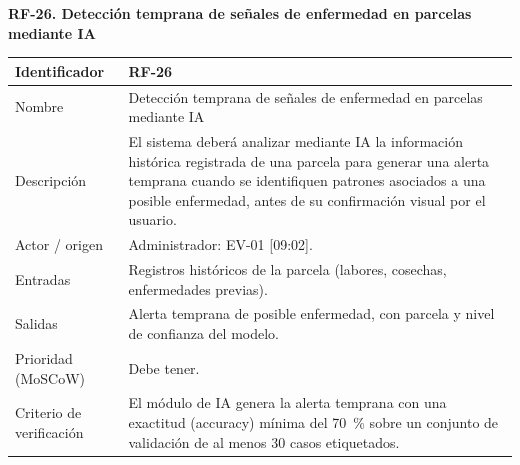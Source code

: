 \documentclass[12pt,a4paper]{article}
\begin{document}
\begin{minipage}{\linewidth}
\bigskip
\noindent\textbf{RF-26. Detección temprana de señales de enfermedad en parcelas mediante IA}
\label{tab:RF-26}

\begin{center}
\begin{tabular}{|p{3.5cm}|p{10.7cm}|}
\hline
Identificador & RF-26 \\
\hline
Nombre & Detección temprana de señales de enfermedad en parcelas mediante IA \\
\hline
Descripción & El sistema deberá analizar mediante IA la información histórica registrada de una parcela para generar una alerta temprana cuando se identifiquen patrones asociados a una posible enfermedad, antes de su confirmación visual por el usuario. \\
\hline
Actor / origen & Administrador: EV-01 [09:02]. \\
\hline
Entradas & Registros históricos de la parcela (labores, cosechas, enfermedades previas). \\
\hline
Salidas & Alerta temprana de posible enfermedad, con parcela y nivel de confianza del modelo. \\
\hline
Prioridad (MoSCoW) & Debe tener. \\
\hline
Criterio de verificación & El módulo de IA genera la alerta temprana con una exactitud (accuracy) mínima del 70~\% sobre un conjunto de validación de al menos 30 casos etiquetados. \\
\hline
\end{tabular}
\end{center}
\end{minipage}
\end{document}
